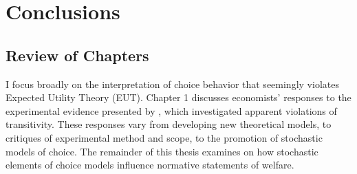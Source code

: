 \documentclass[../main.tex]{subfiles}
\begin{document}
\doublespacing
\setcounter{chapter}{4}

\chapter{Conclusions}


\section{Review of Chapters}


I focus broadly on the interpretation of choice behavior that seemingly violates Expected Utility Theory (EUT).
Chapter 1 discusses economists' responses to the experimental evidence presented by \textcite{Grether1979}, which investigated apparent violations of transitivity.
These responses vary from developing new theoretical models, to critiques of experimental method and scope, to the promotion of stochastic models of choice.
The remainder of this thesis examines on how stochastic elements of choice models influence normative statements of welfare.
\end{document}
